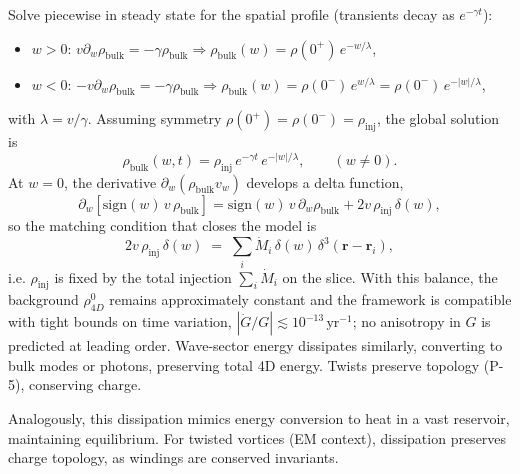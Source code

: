 Solve piecewise in steady state for the spatial profile (transients decay as $e^{-\gamma t}$):
\begin{itemize}
\item $w>0$: $v\partial_w\rho_{\text{bulk}}=-\gamma\rho_{\text{bulk}}\Rightarrow \rho_{\text{bulk}}(w)=\rho(0^+)\,e^{-w/\lambda}$,
\item $w<0$: $-v\partial_w\rho_{\text{bulk}}=-\gamma\rho_{\text{bulk}}\Rightarrow \rho_{\text{bulk}}(w)=\rho(0^-)\,e^{w/\lambda}=\rho(0^-)\,e^{-|w|/\lambda}$,
\end{itemize}
with $\lambda=v/\gamma$. Assuming symmetry $\rho(0^+)=\rho(0^-)=\rho_{\text{inj}}$, the global solution is
\begin{equation}
\rho_{\text{bulk}}(w,t)=\rho_{\text{inj}}\,e^{-\gamma t}\,e^{-|w|/\lambda},\qquad (w\neq 0).
\end{equation}
At $w=0$, the derivative $\partial_w(\rho_{\text{bulk}} v_w)$ develops a delta function,
\begin{equation}
\partial_w\!\left[\mathrm{sign}(w)\,v\,\rho_{\text{bulk}}\right]
= \mathrm{sign}(w)\,v\,\partial_w\rho_{\text{bulk}} + 2v\,\rho_{\text{inj}}\,\delta(w),
\end{equation}
so the matching condition that closes the model is
\begin{equation}
2v\,\rho_{\text{inj}}\,\delta(w)\;=\;\sum_i \dot M_i\,\delta(w)\,\delta^3(\mathbf r-\mathbf r_i),
\end{equation}
i.e. $\rho_{\text{inj}}$ is fixed by the total injection $\sum_i\dot M_i$ on the slice. With this balance, the background $\rho_{4D}^0$ remains approximately constant and the framework is compatible with tight bounds on time variation, $|\dot G/G|\lesssim 10^{-13}\,\mathrm{yr}^{-1}$; no anisotropy in $G$ is predicted at leading order. Wave-sector energy dissipates similarly, converting to bulk modes or photons, preserving total 4D energy. Twists preserve topology (P-5), conserving charge.

Analogously, this dissipation mimics energy conversion to heat in a vast reservoir, maintaining equilibrium. For twisted vortices (EM context), dissipation preserves charge topology, as windings are conserved invariants.


